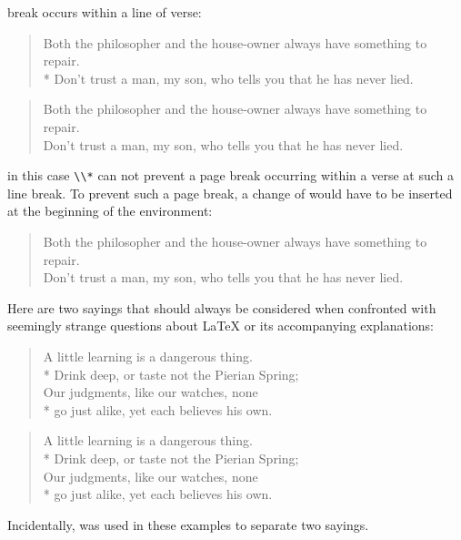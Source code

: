 \begin{Example}
      break occurs within a line of verse:
\begin{lstcode}
  \begin{verse}
    Both the philosopher and the house-owner
    always have something to repair.\\*
    \bigskip
    Don't trust a man, my son, who tells you
    that he has never lied.
  \end{verse}
\end{lstcode}
      \begin{ShowOutput}
        \begin{verse}
    	  Both the philosopher and the house-owner always have something to
          repair.\\
          \bigskip Don't trust a man, my son, who tells you that he has never
          lied.
        \end{verse}
      \end{ShowOutput}
      in this case \verb|\\*| can not prevent a page break occurring within a
      verse at such a line break. To prevent such a page break, a change of
       would have to be
      inserted at the beginning of the environment:
\begin{lstcode}
  \begin{verse}
    Both the philosopher and the house-owner
    always have something to repair.\\
    \bigskip
    Don't trust a man, my son, who tells you
    that he has never lied.
  \end{verse}
\end{lstcode}
      \iftrue%
        Here are two sayings that should always be considered when confronted
        with seemingly strange questions about {\LaTeX} or its accompanying
        explanations:
\begin{lstcode}
  \begin{verse}
    A little learning is a dangerous thing.\\*
    Drink deep, or taste not the Pierian Spring;\\
    \bigskip
    Our judgments, like our watches, none\\*
    go just alike, yet each believes his own.
  \end{verse}
\end{lstcode}
        \begin{ShowOutput}
          \begin{verse}
            A little learning is a dangerous thing.\\*
            Drink deep, or taste not the Pierian Spring;\\
            \bigskip
            Our judgments, like our watches, none\\*
            go just alike, yet each believes his own.
          \end{verse}
        \end{ShowOutput}
      \fi
      Incidentally,  was used in these examples to separate two
      sayings.
    \end{Example}
